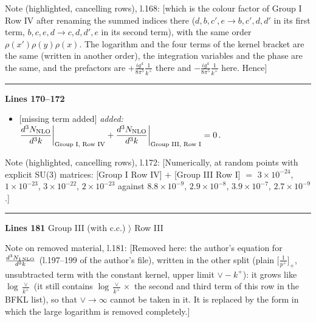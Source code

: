 \documentclass[10pt]{article}
\newenvironment{notebox}{\def\FrameCommand{{\color{notebar}\vrule width 1.5pt}\hspace{6pt}}\MakeFramed{\advance\hsize-\width\FrameRestore}\small}{\endMakeFramed}
\begin{document}
\begin{notebox}\textsf{\small Note (highlighted, cancelling rows), l.168:} [which is the colour factor of Group I Row IV after renaming the summed indices there ($d,b,c',e\to b,c',d,d'$ in its first term, $b,c,e,d\to c,d,d',e$ in its second term), with the same order $\rho(x')\rho(y)\rho(x)$. The logarithm and the four terms of the kernel bracket are the same (written in another order), the integration variables and the phase are the same, and the prefactors are $+\frac{ig^{4}}{8\pi^{5}}\frac{1}{k^{+}}$ there and $-\frac{ig^{4}}{8\pi^{5}}\frac{1}{k^{+}}$ here. Hence]\end{notebox}
\noindent\rule{\linewidth}{0.3pt}\par\noindent\textbf{Lines 170--172} \par
\begin{itemize}[leftmargin=2.2em,itemsep=1pt,topsep=2pt]
\item[\textbf{l.170}] \textsf{\small [missing term added]} \emph{added:} $\displaystyle \frac{d^{3}N_{\rm NLO}}{d^{3}k}\bigg|_{\text{Group I, Row IV}}+\frac{d^{3}N_{\rm NLO}}{d^{3}k}\bigg|_{\text{Group III, Row I}}=0\,.$
\end{itemize}
\begin{notebox}\textsf{\small Note (highlighted, cancelling rows), l.172:} [Numerically, at random points with explicit SU(3) matrices: [Group I Row IV] $+$ [Group III Row I] $=$ $3\times10^{-24}$, $1\times10^{-23}$, $3\times10^{-22}$, $2\times10^{-23}$ against $8.8\times10^{-9}$, $2.9\times10^{-8}$, $3.9\times10^{-7}$, $2.7\times10^{-9}$.]\end{notebox}
\noindent\rule{\linewidth}{0.3pt}\par\noindent\textbf{Lines 181} \quad \textsf{Group III (with c.c.) $\rangle$ Row III}\par
\begin{notebox}\textsf{\small Note on removed material, l.181:} [Removed here: the author's equation for $\frac{d^{3}N_{1\,\rm NLO}}{d^{3}k}$ (l.197--199 of the author's file), written in the other split (plain $\big[\frac{1}{p^{+}}\big]_{+}$, unsubtracted term with the constant kernel, upper limit $\vee-k^{+}$): it grows like $\log\frac{\vee}{k^{+}}$ (it still contains $\log\frac{\vee}{k^{+}}\times$ the second and third term of this row in the BFKL list), so that $\vee\to\infty$ cannot be taken in it. It is replaced by the form in which the large logarithm is removed completely.]\end{notebox}
\end{document}
